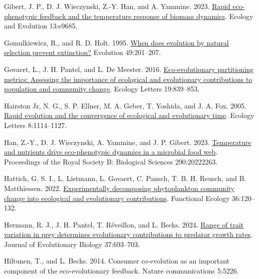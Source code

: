 \documentclass[
]{article}
\newlength{\cslhangindent}
\newlength{\cslentryspacingunit} %
\newenvironment{CSLReferences}[2] %
 {%
  \setlength{\parindent}{0pt}
  \ifodd #1
  \let\oldpar\par
  \def\par{\hangindent=\cslhangindent\oldpar}
  \fi
  \setlength{\parskip}{#2\cslentryspacingunit}
 }%
 {}
\begin{document}
\begin{CSLReferences}{0}{0}
\leavevmode{}%
Gibert, J. P., D. J. Wieczynski, Z.-Y. Han, and A. Yammine. 2023. \href{https://doi.org/10.1002/ece3.9685}{Rapid eco-phenotypic feedback and the temperature response of biomass dynamics}. Ecology and Evolution 13:e9685.

\leavevmode{}%
Gomulkiewicz, R., and R. D. Holt. 1995. \href{http://www.jstor.org/stable/2410305}{When does evolution by natural selection prevent extinction?} Evolution 49:201--207.

\leavevmode{}%
Govaert, L., J. H. Pantel, and L. De Meester. 2016. \href{https://doi.org/10.1111/ele.12632}{Eco-evolutionary partitioning metrics: Assessing the importance of ecological and evolutionary contributions to population and community change}. Ecology Letters 19:839--853.

\leavevmode{}%
Hairston Jr, N. G., S. P. Ellner, M. A. Geber, T. Yoshida, and J. A. Fox. 2005. \href{https://doi.org/10.1111/j.1461-0248.2005.00812.x}{Rapid evolution and the convergence of ecological and evolutionary time}. Ecology Letters 8:1114--1127.

\leavevmode{}%
Han, Z.-Y., D. J. Wieczynski, A. Yammine, and J. P. Gibert. 2023. \href{https://doi.org/10.1098/rspb.2022.2263}{Temperature and nutrients drive eco-phenotypic dynamics in a microbial food web}. Proceedings of the Royal Society B: Biological Sciences 290:20222263.

\leavevmode{}%
Hattich, G. S. I., L. Listmann, L. Govaert, C. Pansch, T. B. H. Reusch, and B. Matthiessen. 2022. \href{https://doi.org/10.1111/1365-2435.13923}{Experimentally decomposing phytoplankton community change into ecological and evolutionary contributions}. Functional Ecology 36:120--132.

\leavevmode{}%
Hermann, R. J., J. H. Pantel, T. Réveillon, and L. Becks. 2024. \href{https://doi.org/10.1093/jeb/voae062}{{Range of trait variation in prey determines evolutionary contributions to predator growth rates}}. Journal of Evolutionary Biology 37:693--703.

\leavevmode{}%
Hiltunen, T., and L. Becks. 2014. Consumer co-evolution as an important component of the eco-evolutionary feedback. Nature communications 5:5226.


\end{CSLReferences}
\end{document}
